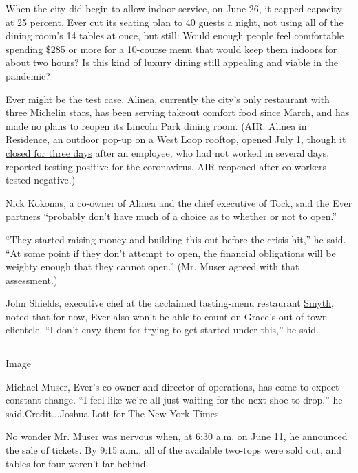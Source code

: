 When the city did begin to allow indoor service, on June 26, it capped
capacity at 25 percent. Ever cut its seating plan to 40 guests a night,
not using all of the dining room's 14 tables at once, but still: Would
enough people feel comfortable spending \$285 or more for a 10-course
menu that would keep them indoors for about two hours? Is this kind of
luxury dining still appealing and viable in the pandemic?

Ever might be the test case.
\href{https://www.alinearestaurant.com/}{Alinea}, currently the city's
only restaurant with three Michelin stars, has been serving takeout
comfort food since March, and has made no plans to reopen its Lincoln
Park dining room.
(\href{https://www.exploretock.com/alinea/experience/156965/air-alinea-in-residence?date=2020-07-31\&size=4\&time=20\%3A00}{AIR:
Alinea in Residence}, an outdoor pop-up on a West Loop rooftop, opened
July 1, though it
\href{https://blockclubchicago.org/2020/07/11/alinea-pop-up-closed-after-staffer-tests-positive-for-coronavirus-days-after-covid-19-canape-backlash/}{closed
for three days} after an employee, who had not worked in several days,
reported testing positive for the coronavirus. AIR reopened after
co-workers tested negative.)

Nick Kokonas, a co-owner of Alinea and the chief executive of Tock, said
the Ever partners ``probably don't have much of a choice as to whether
or not to open.''

``They started raising money and building this out before the crisis
hit,'' he said. ``At some point if they don't attempt to open, the
financial obligations will be weighty enough that they cannot open.''
(Mr. Muser agreed with that assessment.)

John Shields, executive chef at the acclaimed tasting-menu restaurant
\href{https://www.smythandtheloyalist.com/smyth/}{Smyth}, noted that for
now, Ever also won't be able to count on Grace's out-of-town clientele.
``I don't envy them for trying to get started under this,'' he said.

\begin{center}\rule{0.5\linewidth}{\linethickness}\end{center}

Image

Michael Muser, Ever's co-owner and director of operations, has come to
expect constant change. ``I feel like we're all just waiting for the
next shoe to drop,'' he said.Credit...Joshua Lott for The New York Times

No wonder Mr. Muser was nervous when, at 6:30 a.m. on June 11, he
announced the sale of tickets. By 9:15 a.m., all of the available
two-tops were sold out, and tables for four weren't far behind.

